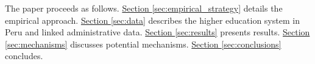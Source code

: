 The paper proceeds as follows. \hyperref[sec:empirical_strategy]{Section \ref{sec:empirical_strategy}} details the empirical approach. \hyperref[sec:data]{Section \ref{sec:data}}  describes the higher education system in Peru and linked administrative data. \hyperref[sec:results]{Section \ref{sec:results}} presents results. \hyperref[sec:mechanisms]{Section \ref{sec:mechanisms}} discusses potential mechanisms. \hyperref[sec:conclusions]{Section \ref{sec:conclusions}} concludes.





